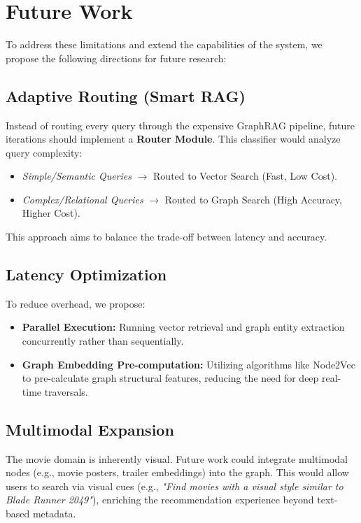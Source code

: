 \documentclass[a4paper, 12pt]{extreport}
\begin{document}
\section{Future Work}
To address these limitations and extend the capabilities of the system, we propose the following directions for future research:

\subsection{Adaptive Routing (Smart RAG)}
Instead of routing every query through the expensive GraphRAG pipeline, future iterations should implement a \textbf{Router Module}. This classifier would analyze query complexity:
\begin{itemize}
    \item[] \textit{Simple/Semantic Queries} $\rightarrow$ Routed to Vector Search (Fast, Low Cost).
    \item[] \textit{Complex/Relational Queries} $\rightarrow$ Routed to Graph Search (High Accuracy, Higher Cost).
\end{itemize}
This approach aims to balance the trade-off between latency and accuracy.

\subsection{Latency Optimization}
To reduce overhead, we propose:
\begin{itemize}
    \item[] \textbf{Parallel Execution:} Running vector retrieval and graph entity extraction concurrently rather than sequentially.
    \item[] \textbf{Graph Embedding Pre-computation:} Utilizing algorithms like Node2Vec to pre-calculate graph structural features, reducing the need for deep real-time traversals.
\end{itemize}

\subsection{Multimodal Expansion}
The movie domain is inherently visual. Future work could integrate multimodal nodes (e.g., movie posters, trailer embeddings) into the graph. This would allow users to search via visual cues (e.g., \textit{"Find movies with a visual style similar to Blade Runner 2049"}), enriching the recommendation experience beyond text-based metadata.



\renewcommand\bibname{Reference}
\printbibliography
{}
\end{document}
